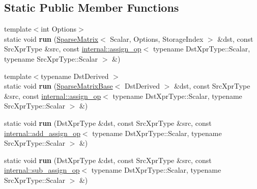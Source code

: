 \subsection*{Static Public Member Functions}
\begin{DoxyCompactItemize}
\item 
\mbox{\label{struct_eigen_1_1internal_1_1_assignment_3_01_dst_xpr_type_00_01_src_xpr_type_00_01_functor_00_01_diagonal2_sparse_01_4_a3ebebc30f1ceca09787e5ad5c0fd9c43}} 
{\footnotesize template$<$int Options$>$ }\\static void {\bfseries run} (\mbox{\hyperlink{class_eigen_1_1_sparse_matrix}{Sparse\+Matrix}}$<$ Scalar, Options, Storage\+Index $>$ \&dst, const Src\+Xpr\+Type \&src, const \mbox{\hyperlink{struct_eigen_1_1internal_1_1assign__op}{internal\+::assign\+\_\+op}}$<$ typename Dst\+Xpr\+Type\+::\+Scalar, typename Src\+Xpr\+Type\+::\+Scalar $>$ \&)
\item 
\mbox{\label{struct_eigen_1_1internal_1_1_assignment_3_01_dst_xpr_type_00_01_src_xpr_type_00_01_functor_00_01_diagonal2_sparse_01_4_af302c9a90f62006c28bec8184a1c3c08}} 
{\footnotesize template$<$typename Dst\+Derived $>$ }\\static void {\bfseries run} (\mbox{\hyperlink{class_eigen_1_1_sparse_matrix_base}{Sparse\+Matrix\+Base}}$<$ Dst\+Derived $>$ \&dst, const Src\+Xpr\+Type \&src, const \mbox{\hyperlink{struct_eigen_1_1internal_1_1assign__op}{internal\+::assign\+\_\+op}}$<$ typename Dst\+Xpr\+Type\+::\+Scalar, typename Src\+Xpr\+Type\+::\+Scalar $>$ \&)
\item 
\mbox{\label{struct_eigen_1_1internal_1_1_assignment_3_01_dst_xpr_type_00_01_src_xpr_type_00_01_functor_00_01_diagonal2_sparse_01_4_aa5fb6b65cca9c9cbafd0102a9b8184dc}} 
static void {\bfseries run} (Dst\+Xpr\+Type \&dst, const Src\+Xpr\+Type \&src, const \mbox{\hyperlink{struct_eigen_1_1internal_1_1add__assign__op}{internal\+::add\+\_\+assign\+\_\+op}}$<$ typename Dst\+Xpr\+Type\+::\+Scalar, typename Src\+Xpr\+Type\+::\+Scalar $>$ \&)
\item 
\mbox{\label{struct_eigen_1_1internal_1_1_assignment_3_01_dst_xpr_type_00_01_src_xpr_type_00_01_functor_00_01_diagonal2_sparse_01_4_a6c98a58cd979be473443ee7b6c5fed0e}} 
static void {\bfseries run} (Dst\+Xpr\+Type \&dst, const Src\+Xpr\+Type \&src, const \mbox{\hyperlink{struct_eigen_1_1internal_1_1sub__assign__op}{internal\+::sub\+\_\+assign\+\_\+op}}$<$ typename Dst\+Xpr\+Type\+::\+Scalar, typename Src\+Xpr\+Type\+::\+Scalar $>$ \&)
\end{DoxyCompactItemize}


